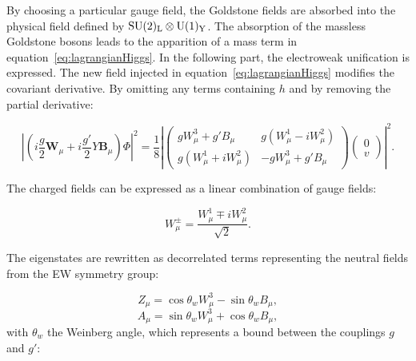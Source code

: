       By choosing a particular gauge field, the Goldstone fields are absorbed into the physical field defined by $\rm{SU}(2)_{\rm{L}} \otimes \rm{U}(1)_{\rm{Y}}$.
      The absorption of the massless Goldstone bosons leads to the apparition of a mass term in equation~\ref{eq:lagrangianHiggs}.
      In the following part, the electroweak unification is expressed.
      The new field injected in equation~\ref{eq:lagrangianHiggs} modifies the covariant derivative.
      By omitting any terms containing $h$ and by removing the partial derivative: 

      \begin{equation}
        \left|\left(i\frac{g}{2}\textbf{W}_{\mu} +i\frac{g'}{2}Y\textbf{B}_{\mu}\right) \Phi \right|^2 = \frac{1}{8}\left|
                \begin{pmatrix}
                   gW^3_{\mu} +g'B_{\mu} & g(W^1_{\mu} - i W^2_{\mu}) \\
                   g(W^1_{\mu} + i W^2_{\mu}) & - g W^3_{\mu} + g'B_{\mu}
                \end{pmatrix}
                \begin{pmatrix}
                  0 \\
                  v
                \end{pmatrix}
           \right|^2.
        \label{eq:derHiggs}
      \end{equation}

      The charged fields can be expressed as a linear combination of gauge fields:

      \begin{equation}
        W^{\pm}_{\mu} = \frac{W^1_{\mu} \mp iW^2_{\mu}}{\sqrt{2}}.
      \end{equation}

      The eigenstates are rewritten as decorrelated terms representing the neutral fields from the \gls{EW} symmetry group:

      \begin{equation}
        Z_{\mu} = \cos{\theta_{w}W^3_{\mu}} - \sin{\theta_{w}B_{\mu}},
      \end{equation}
      \begin{equation}
        A_{\mu} = \sin{\theta_{w}W^3_{\mu}} + \cos{\theta_{w}B_{\mu}},
      \end{equation}
      with $\theta_{w}$ the Weinberg angle, which represents a bound between the couplings $g$ and $g'$:
     
